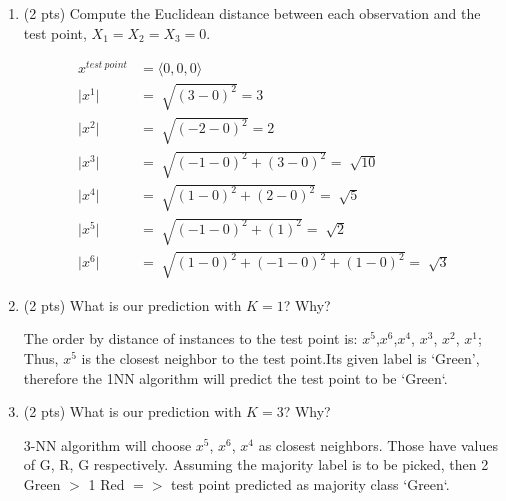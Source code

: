 \documentclass[a4paper]{article}
\theoremstyle{definition}
\newenvironment{soln}{
    \leavevmode\color{blue}\ignorespaces
}{}
\begin{document}
\begin{enumerate}
        \begin{enumerate}
          \item (2 pts) Compute the Euclidean distance between each observation and the test point, $X_{1} = X_{2} = X_{3}=0$.
                \begin{soln}
                  \begin{align}
                    x^{test\ point} & = \langle {0, 0, 0} \rangle                           \\
                    \vert x^1 \vert & = \sqrt[]{(3-0)^2} = 3                                \\
                    \vert x^2 \vert & = \sqrt[]{(-2-0)^2 } = 2                              \\
                    \vert x^3 \vert & = \sqrt[]{(-1-0)^2 + (3-0)^2 } = \sqrt[]{10}          \\
                    \vert x^4 \vert & = \sqrt[]{(1-0)^2 + (2-0)^2 } = \sqrt[]{5}            \\
                    \vert x^5 \vert & = \sqrt[]{(-1-0)^2 +  (1)^2 } = \sqrt[]{2}            \\
                    \vert x^6 \vert & = \sqrt[]{(1-0)^2 + (-1-0)^2 + (1-0)^2 } = \sqrt[]{3}
                  \end{align}
                \end{soln}
          \item (2 pts) What is our prediction with $K=1$? Why?

                \begin{soln}
                  The order by distance of instances to the test point is: $x^5$,$x^6$,$x^4$, $x^3$, $x^2$, $x^1$; Thus, $x^5$ is the closest neighbor to the test point.Its given label is `Green', therefore the 1NN algorithm will predict the test point to be `Green`.
                \end{soln}

          \item (2 pts) What is our prediction with $K=3$? Why?

                \begin{soln}
                  3-NN algorithm will choose $x^5$, $x^6$, $x^4$ as closest neighbors. Those have values of {G, R, G}  respectively. Assuming the majority label is to be picked, then {2 Green $>$ 1 Red} $=>$ test point predicted as majority class `Green`.
                \end{soln}

        \end{enumerate}


\end{enumerate}
\end{document}
